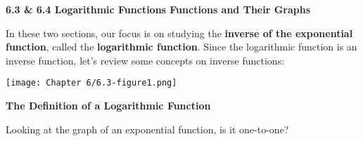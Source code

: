 \documentclass[12pt]{book}
\begin{document}
\begin{comment}
Name: \underline{\hspace{100mm}}
\vspace{20mm}
  \centerline{\Large \textbf{Chapter 2: Equations and Inequalities} } 

{\large
\begin{center}
\begin{varwidth}{\textwidth}
\begin{enumerate}[2.1]
    \item The Regular Coordinate System and Graphs
    \item Linear Equations in One Variable
    \item Models and  Applications (Skipping)
    \item Complex Numbers
    \item Quadratic Equations
    \item Other Types of Equations
    \item Linear Inequalities and Absolute Value Inequalities
\end{enumerate}
\end{varwidth}
\end{center}

}
\newpage  
\end{comment}

{\Large \textbf{6.3 \& 6.4 Logarithmic Functions Functions and Their Graphs}}

In these two sections, our focus is on studying the \textbf{inverse of the exponential function}, called the \textbf{logarithmic function}. Since the logarithmic function is an inverse function, let's review some concepts on inverse functions:


\centerline{\texttt{[image: Chapter 6/6.3-figure1.png]}}
\vspace{3mm}

{\large \textbf{The Definition of a Logarithmic Function}}

Looking at the graph of an exponential function, is it one-to-one? 
\end{document}
